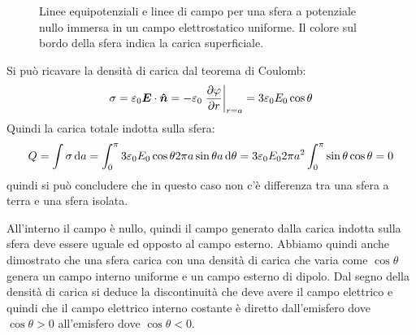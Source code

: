 \begin{Es}
\begin{figure}[htbp]
    \caption{Linee equipotenziali e linee di campo per una sfera a potenziale nullo immersa in un campo elettrostatico uniforme. Il colore sul bordo della sfera indica la carica superficiale.}
  \end{figure}
  Si può ricavare la densità di carica dal teorema di Coulomb:
  \[
    \sigma = \varepsilon_0\boldsymbol{E}\cdot \boldsymbol{\hat {n}} = -\varepsilon_0\left.\frac{\partial\varphi}{\partial r}\right|_{r=a}=3\varepsilon_0 E_0\cos\theta
  \]
  Quindi la carica totale indotta sulla sfera:
  \[
    Q = \int \sigma\,\mathrm{d} a = \int_0^\pi 3\varepsilon_0 E_0\cos\theta 2\pi a\sin\theta a\,\mathrm{d}\theta = 3\varepsilon_0E_02\pi a^2\int_0^\pi\sin\theta\cos\theta = 0
  \]
  quindi si può concludere che in questo caso non c'è differenza tra una sfera a terra e una sfera isolata.

  All'interno il campo è nullo, quindi il campo generato dalla carica indotta sulla sfera deve essere uguale ed opposto al campo esterno. Abbiamo quindi anche dimostrato che una sfera carica con una densità di carica che varia come $\cos\theta$ genera un campo interno uniforme e un campo esterno di dipolo. Dal segno della densità di carica si deduce la discontinuità che deve avere il campo elettrico e quindi che il campo elettrico interno costante è diretto dall'emisfero dove $\cos\theta>0$ all'emisfero dove $\cos\theta<0$.
\end{Es}


